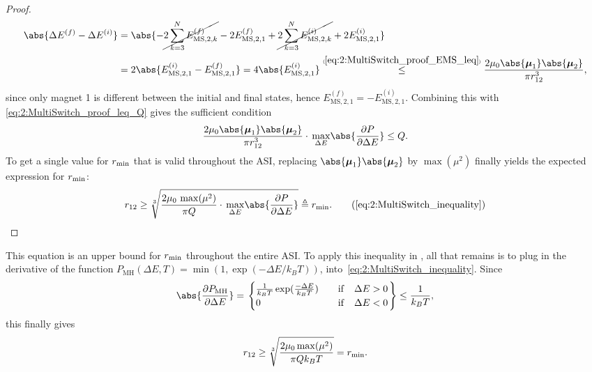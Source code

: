\begin{proof}
	\begin{align*}
		\abs{\Delta E^{(f)} - \Delta E^{(i)}} &= \abs{-\cancel{2 \sum_{k=3}^N E_{\mathrm{MS},2,k}^{(f)}} -2 E_{\mathrm{MS},2,1}^{(f)} +\cancel{2 \sum_{k=3}^N E_{\mathrm{MS},2,k}^{(i)}} +2 E_{\mathrm{MS},2,1}^{(i)}} \\
		&= 2\abs{E_{\mathrm{MS},2,1}^{(i)} - E_{\mathrm{MS},2,1}^{(f)}} = 4 \abs{E_{\mathrm{MS},2,1}^{(i)}} \numeq{\ref{eq:2:MultiSwitch_proof_EMS_leq}}{\leq} \frac{2 \mu_0 \abs{\vc{\mu}_1} \abs{\vc{\mu}_2}}{\pi r_{12}^3} \mathrm{,}
	\end{align*}
	since only magnet 1 is different between the initial and final states, hence $E_{\mathrm{MS},2,1}^{(f)} = - E_{\mathrm{MS},2,1}^{(i)}$.
	Combining this with \eqref{eq:2:MultiSwitch_proof_leq_Q} gives the sufficient condition
	\begin{equation}
		\frac{2 \mu_0 \abs{\vc{\mu}_1} \abs{\vc{\mu}_2}}{\pi r_{12}^3} \cdot \, \underset{\Delta E}{\max} \abs{\frac{\partial P}{\partial \Delta E}} \leq Q \mathrm{.}
	\end{equation}
	To get a single value for $r_\mathrm{min}$ that is valid throughout the ASI, replacing $\abs{\vc{\mu}_1} \abs{\vc{\mu}_2}$ by $\max(\mu^2)$ finally yields the expected expression for $r_\mathrm{min}$:
	\begin{equation*}
		r_{12} \geq \sqrt[3]{\frac{2 \mu_0 \, \max(\mu^2)}{\pi Q} \cdot \, \underset{\Delta E}{\max} \abs{\frac{\partial P}{\partial \Delta E}}} \triangleq \rmin \mathrm{.} \tag{\ref*{eq:2:MultiSwitch_inequality}}
	\end{equation*}
\end{proof}
This equation is an upper bound for $r_\mathrm{min}$ throughout the entire ASI.
To apply this inequality in \hotspice, all that remains is to plug in the derivative of the   function $P_\mathrm{MH}(\Delta E, T) = \min(1, \exp(-\Delta E/k_B T))$, into~\cref{eq:2:MultiSwitch_inequality}.
Since
\begin{equation}
	\abs{\frac{\partial P_\mathrm{MH}}{\partial \Delta E}} = \left.\begin{cases}
		\frac{1}{k_B T} \exp(\frac{-\Delta E}{k_B T}) \quad &\mathrm{if} \quad \Delta E > 0 \\
		0 \quad &\mathrm{if} \quad \Delta E < 0
	\end{cases} \right\}
	\leq \frac{1}{k_B T} \mathrm{,}
\end{equation}
this finally gives
\begin{equation}
	r_{12} \geq \sqrt[3]{\frac{2 \mu_0 \max(\mu^2)}{\pi Q k_B T}} = r_\mathrm{min} \mathrm{.}
\end{equation}
